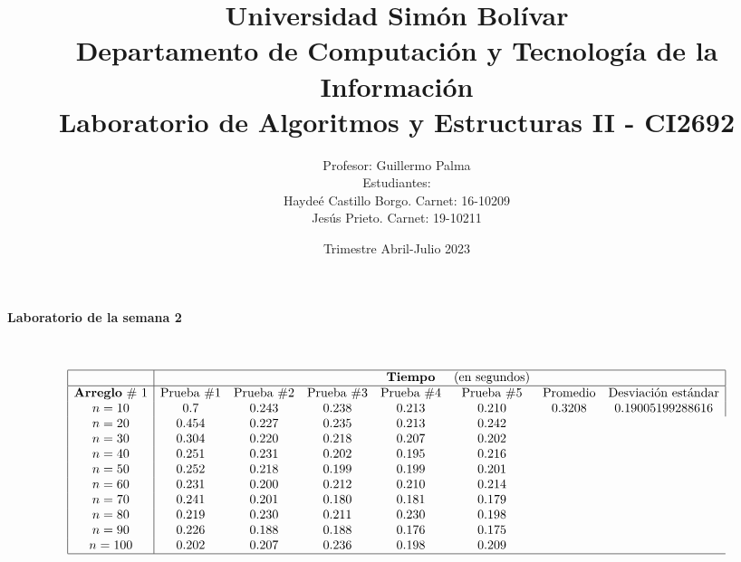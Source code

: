\documentclass{article}
\begin{document}
	\title{\normalsize{Universidad Sim\'on Bol\'ivar\\
			Departamento de Computaci\'on y Tecnolog\'ia de la Informaci\'on\\
			Laboratorio de Algoritmos y Estructuras II - CI2692}}
	\author{\normalsize{Profesor: Guillermo Palma}\\
		\normalsize{Estudiantes:}\\
		\normalsize{Hayde\'e Castillo Borgo. Carnet: 16-10209}\\
		\normalsize{Jes\'us Prieto. Carnet: 19-10211}}
	\date{\normalsize{Trimestre Abril-Julio 2023}}
	\maketitle
	\begin{center}
		\Large{\textbf{Laboratorio de la semana 2}}
	\end{center}\
	
	$$\begin{array}{|c|ccccccc|}
		\hline
		& & &&\text{\textbf{Tiempo}} &\text{(en segundos)} & &\\
		\hline
		\text{\textbf{Arreglo}\ \# 1} & \text{Prueba}\ \# 1 & \text{Prueba}\ \# 2 & \text{Prueba}\ \# 3 & \text{Prueba}\ \# 4 & \text{Prueba}\ \# 5 & \text{Promedio} & \text{Desviación estándar}\\
		n = 10 & 0.7 & 0.243 & 0.238 & 0.213 & 0.210 & 0.3208 & 0.19005199288616\\
		n = 20 & 0.454 & 0.227 & 0.235 & 0.213 & 0.242\\
		n = 30 & 0.304 & 0.220 & 0.218 & 0.207 & 0.202\\
		n = 40 & 0.251 & 0.231 & 0.202 & 0.195 & 0.216\\
		n = 50 & 0.252 & 0.218 & 0.199 & 0.199 & 0.201\\
		n = 60 & 0.231 & 0.200 & 0.212 & 0.210 & 0.214\\
		n = 70 & 0.241 & 0.201 & 0.180 & 0.181 & 0.179\\
		n = 80 & 0.219 & 0.230 & 0.211 & 0.230 & 0.198\\
		n = 90 & 0.226 & 0.188 & 0.188 & 0.176 & 0.175\\
		n = 100 & 0.202 & 0.207 & 0.236 & 0.198 & 0.209\\
		\hline
	\end{array}$$
\end{document}
